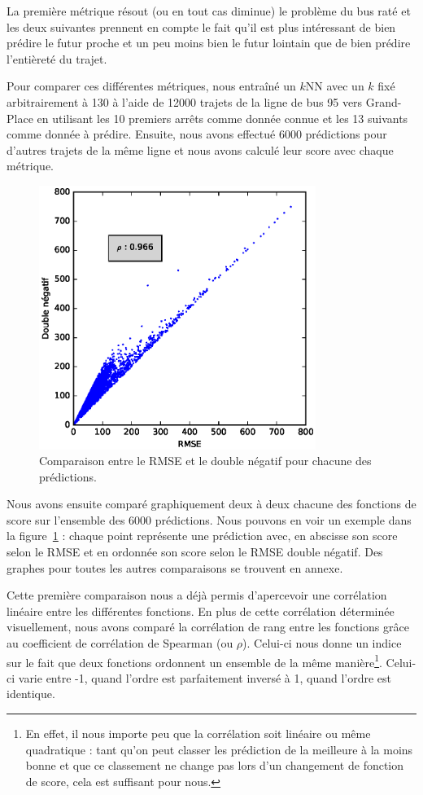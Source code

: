 \documentclass[letterpaper]{article}
\begin{document}
La première métrique résout (ou en tout cas diminue) le problème du bus raté et les deux suivantes prennent en compte le fait qu'il est plus intéressant de bien prédire le futur proche et un peu moins bien le futur lointain que de bien prédire l'entièreté du trajet.

Pour comparer ces différentes métriques, nous entraîné un $k$NN avec un $k$ fixé arbitrairement à 130 à l'aide de 12000 trajets de la ligne de bus 95 vers Grand-Place en utilisant les 10 premiers arrêts comme donnée connue et les 13 suivants comme donnée à prédire. Ensuite, nous avons effectué 6000 prédictions pour d'autres trajets de la même ligne et nous avons calculé leur score avec chaque métrique.

\begin{figure}[h]
   \centerline{\includegraphics[width=9cm]{metrics.eps}}
   \caption{\label{fig:rmse-vs-double}Comparaison entre le RMSE et le double négatif pour chacune des prédictions.}
\end{figure}

Nous avons ensuite comparé graphiquement deux à deux chacune des fonctions de score sur l'ensemble des 6000 prédictions. Nous pouvons en voir un exemple dans la figure~\ref{fig:rmse-vs-double} : chaque point représente une prédiction avec, en abscisse son score selon le RMSE et en ordonnée son score selon le RMSE double négatif. Des graphes pour toutes les autres comparaisons se trouvent en annexe.

Cette première comparaison nous a déjà permis d'apercevoir une corrélation linéaire entre les différentes fonctions.
En plus de cette corrélation déterminée visuellement, nous avons comparé la corrélation de rang entre les fonctions grâce au coefficient de corrélation de Spearman (ou $\rho$). Celui-ci nous donne un indice sur le fait que deux fonctions ordonnent un ensemble de la même manière\footnote{En effet, il nous importe peu que la corrélation soit linéaire ou même quadratique : tant qu'on peut classer les prédiction de la meilleure à la moins bonne et que ce classement ne change pas lors d'un changement de fonction de score, cela est suffisant pour nous.}. Celui-ci varie entre -1, quand l'ordre est parfaitement inversé à 1, quand l'ordre est identique.
\end{document}

